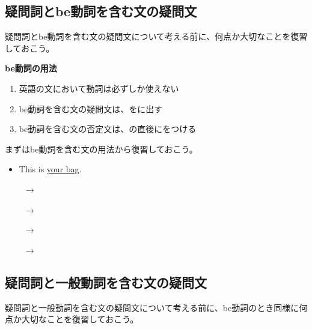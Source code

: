 \subsection{疑問詞とbe動詞を含む文の疑問文}
    疑問詞とbe動詞を含む文の疑問文について考える前に、何点か大切なことを復習しておこう。

    \begin{theorembox}{\textbf{be動詞の用法}}
        \begin{enumerate}
            \item 英語の文において動詞は必ずしか使えない
            \item be動詞を含む文の疑問文は、をに出す
            \item be動詞を含む文の否定文は、の直後にをつける
        \end{enumerate}
    \end{theorembox}

    まずはbe動詞を含む文の用法から復習しておこう。

    \begin{itemize}
        \item This is \underline{your bag}.
        \par\vspace{0.3em}
        \noindent{}\ $\longrightarrow$\ 
        \par\vspace{0.5em}
        \noindent{}\ $\longrightarrow$\ 
        \par\vspace{0.5em}
        \noindent{}\ $\longrightarrow$\ 
        \par\vspace{0.5em}
        \noindent{}\ $\longrightarrow$\ 
    \end{itemize}

\subsection{疑問詞と一般動詞を含む文の疑問文}
    疑問詞と一般動詞を含む文の疑問文について考える前に、be動詞のとき同様に何点か大切なことを復習しておこう。

